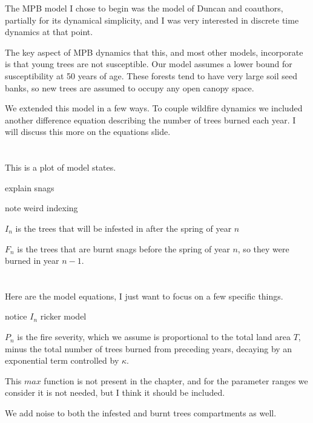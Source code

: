 \documentclass{article}
\begin{document}
The MPB model I chose to begin was the model of Duncan and coauthors, partially for its dynamical simplicity, and I was very interested in discrete time dynamics at that point.

The key aspect of MPB dynamics that this, and most other models, incorporate is that young trees are not susceptible. Our model assumes a lower bound for susceptibility at 50 years of age. These forests tend to have very large soil seed banks, so new trees are assumed to occupy any open canopy space.  

We extended this model in a few ways. To couple wildfire dynamics we included another difference equation describing the number of trees burned each year. I will discuss this more on the equations slide.
\section{}

This is a plot of model states.

explain snags

note weird indexing

$I_n$ is the trees that will be infested in after the spring of year $n$

$F_n$ is the trees that are burnt snags before the spring of year $n$, so they were burned in year $n-1$.




\section{}

Here are the model equations, I just want to focus on a few specific things. 


notice $I_n$ ricker model

$P_n$ is the fire severity, which we assume is proportional to the total land area $T$, minus the total number of trees burned from preceding years, decaying by an exponential term controlled by $\kappa$.

This $max$ function is not present in the chapter, and for the parameter ranges we consider it is not needed, but I think it should be included.

We add noise to both the infested and burnt trees compartments as well.
\end{document}

